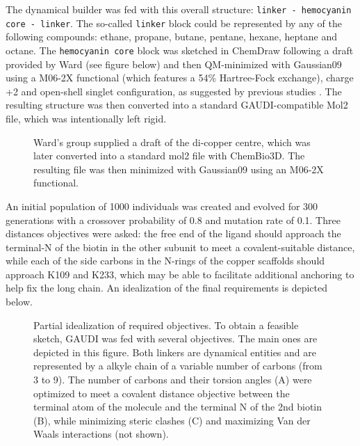 The dynamical builder was fed with this overall structure: \texttt{linker - hemocyanin core - linker}. The so-called \texttt{linker} block could be represented by any of the following compounds: ethane, propane, butane, pentane, hexane, heptane and octane. The \texttt{hemocyanin core} block was sketched in ChemDraw following a draft provided by Ward (see figure below) and then QM-minimized with Gaussian09 \citep{g09} using a M06-2X functional (which features a 54\% Hartree-Fock exchange), charge +2 and open-shell singlet configuration, as suggested by previous studies \citep{Metz2001,Saito2014}. The resulting structure was then converted into a standard GAUDI-compatible Mol2 file, which was intentionally left rigid.
\begin{figure}
\noindent{}
\caption{Ward's group supplied a draft of the di-copper centre, which was later converted into a standard mol2 file with ChemBio3D. The resulting file was then minimized with Gaussian09 using an M06-2X functional.}
\end{figure}

An initial population of 1000 individuals was created and evolved for 300 generations with a crossover probability of 0.8 and mutation rate of 0.1. Three distances objectives were asked: the free end of the ligand should approach the terminal-N of the biotin in the other subunit to meet a covalent-suitable distance, while each of the side carbons in the N-rings of the copper scaffolds should approach K109 and K233, which may be able to facilitate additional anchoring to help fix the long chain. An idealization of the final requirements is depicted below.
\begin{figure}
\noindent{}
\caption{Partial idealization of required objectives. To obtain a feasible sketch, GAUDI was fed with several objectives. The main ones are depicted in this figure. Both linkers are dynamical entities and are represented by a alkyle chain of a variable number of carbons (from 3 to 9). The number of carbons and their torsion angles (A) were optimized to meet a covalent distance objective between the terminal atom of the molecule and the terminal N of the 2nd biotin (B), while minimizing steric clashes (C) and maximizing Van der Waals interactions (not shown).}
\end{figure}



